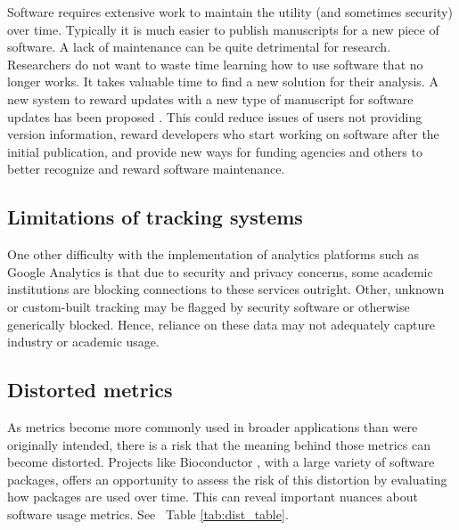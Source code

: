 \documentclass{article}
\begin{document}
Software requires extensive work to maintain the utility (and sometimes security) over time. Typically it is much easier to publish manuscripts for a new piece of software. A lack of maintenance can be quite detrimental for research. Researchers do not want to waste time learning how to use software that no longer works. It takes valuable time to find a new solution for their analysis. A new system to reward updates with a new type of manuscript for software updates has been proposed \cite{merow_better_2023}. This could reduce issues of users not providing version information, reward developers who start working on software after the initial publication, and provide new ways for funding agencies and others to better recognize and reward software maintenance. 

\subsection{Limitations of tracking systems}

One other difficulty with the implementation of analytics platforms such as Google Analytics is that due to security and privacy concerns, some academic institutions are blocking connections to these services outright. Other, unknown or custom-built tracking may be flagged by security software or otherwise generically blocked. Hence, reliance on these data may not adequately capture industry or academic usage.

\subsection{Distorted metrics}

As metrics become more commonly used in broader applications than were originally intended, there is a risk that the meaning behind those metrics can become distorted. Projects like Bioconductor \cite{bioconductor}, with a large variety of software packages, offers an opportunity to assess the risk of this distortion by evaluating how packages are used over time. This can reveal important nuances about software usage metrics. See ~Table \ref{tab:dist_table}.
\end{document}
